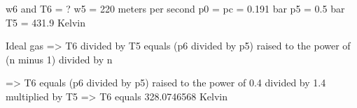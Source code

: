 w6 and T6 = ?  
w5 = 220 meters per second  
p0 = pc = 0.191 bar  
p5 = 0.5 bar  
T5 = 431.9 Kelvin  

Ideal gas =>  
T6 divided by T5 equals (p6 divided by p5) raised to the power of (n minus 1) divided by n  

=> T6 equals (p6 divided by p5) raised to the power of 0.4 divided by 1.4 multiplied by T5  
=> T6 equals 328.0746568 Kelvin